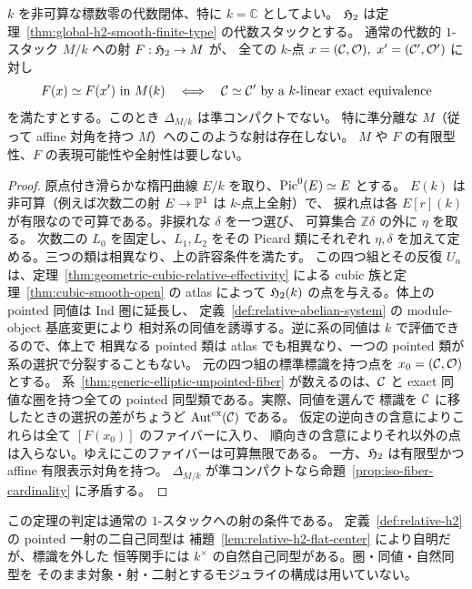 \begin{theorem}
\label{thm:unmarked-diagonal}
$k$ を非可算な標数零の代数閉体、特に $k=\mathbb C$ としてよい。
$\mathfrak H_2$ は定理~\ref{thm:global-h2-smooth-finite-type} の代数スタックとする。
通常の代数的 $1$-スタック $M/k$ への射 $F:\mathfrak H_2\to M$ が、
全ての $k$-点 $x=(\mathcal C,\mathcal O),\ x'=(\mathcal C',\mathcal O')$ に対し
\[
 F(x)\simeq F(x')\text{ in }M(k)
 \quad\Longleftrightarrow\quad
 \mathcal C\simeq\mathcal C'\text{ by a }k\text{-linear exact equivalence}
\]
を満たすとする。このとき $\Delta_{M/k}$ は準コンパクトでない。
特に準分離な $M$（従って affine 対角を持つ $M$）へのこのような射は存在しない。
$M$ や $F$ の有限型性、$F$ の表現可能性や全射性は要しない。
\end{theorem}
\begin{proof}
原点付き滑らかな楕円曲線 $E/k$ を取り、$\operatorname{Pic}^0(E)\simeq E$ とする。
$E(k)$ は非可算（例えば次数二の射 $E\to\mathbb P^1$ は $k$-点上全射）で、
捩れ点は各 $E[r](k)$ が有限なので可算である。非捩れな $\delta$ を一つ選び、
可算集合 $\mathbb Z\delta$ の外に $\eta$ を取る。
次数二の $L_0$ を固定し、$L_1,L_2$ をその Picard 類にそれぞれ
$\eta,\delta$ を加えて定める。三つの類は相異なり、上の許容条件を満たす。
この四つ組とその反復 $U_n$ は、定理~\ref{thm:geometric-cubic-relative-effectivity}
による cubic 族と定理~\ref{thm:cubic-smooth-open} の atlas によって
$\mathfrak H_2(k)$ の点を与える。体上の pointed 同値は Ind 圏に延長し、
定義~\ref{def:relative-abelian-system} の module-object 基底変更により
相対系の同値を誘導する。逆に系の同値は $k$ で評価できるので、体上で
相異なる pointed 類は atlas でも相異なり、一つの pointed 類が系の選択で分裂することもない。
元の四つ組の標準標識を持つ点を $x_0=(\mathcal C,\mathcal O)$ とする。
系~\ref{thm:generic-elliptic-unpointed-fiber} が数えるのは、$\mathcal C$ と
exact 同値な圏を持つ全ての pointed 同型類である。実際、同値を選んで
標識を $\mathcal C$ に移したときの選択の差がちょうど $\operatorname{Aut}^{\mathrm{ex}}(\mathcal C)$ である。
仮定の逆向きの含意によりこれらは全て $[F(x_0)]$ のファイバーに入り、
順向きの含意によりそれ以外の点は入らない。ゆえにこのファイバーは可算無限である。
一方、$\mathfrak H_2$ は有限型かつ affine 有限表示対角を持つ。
$\Delta_{M/k}$ が準コンパクトなら命題~\ref{prop:iso-fiber-cardinality} に矛盾する。
\end{proof}

この定理の判定は通常の $1$-スタックへの射の条件である。
定義~\ref{def:relative-h2} の pointed 一射の二自己同型は
補題~\ref{lem:relative-h2-flat-center} により自明だが、標識を外した
恒等関手には $k^\times$ の自然自己同型がある。圏・同値・自然同型を
そのまま対象・射・二射とするモジュライの構成は用いていない。

